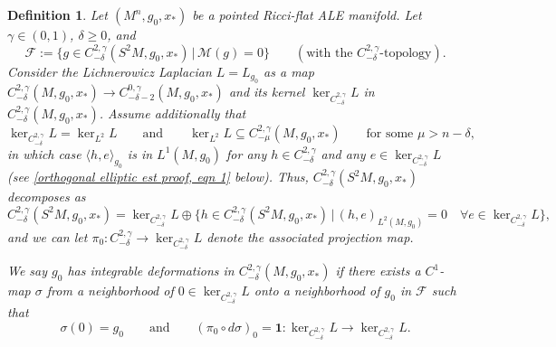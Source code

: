\documentclass[12pt]{amsart}
\renewcommand{\1}{{\mathbf 1}}
\theoremstyle{others}
\newtheorem{defn}[thm]{Definition}
\numberwithin{equation}{section}
\begin{document}
\begin{defn} \label{defn integrable ALE}
    Let $(M^n, g_0, x_*)$ be a pointed Ricci-flat ALE manifold. 
    Let $\gamma \in (0,1)$, $\delta \ge 0$, and
        $$\mathcal F := \{ g \in C^{2, \gamma}_{-\delta}(S^2M, g_0, x_*) \, | \, \mathcal M(g) = 0 \} \qquad (\text{with the } C^{2, \gamma}_{-\delta}  \text{-topology}).$$
    Consider the Lichnerowicz Laplacian $L = L_{g_0}$ as a map $C^{2, \gamma}_{-\delta} (M, g_0, x_*) \to C^{0, \gamma}_{-\delta-2} (M, g_0, x_*)$ and its kernel $\ker_{C^{2, \gamma}_{-\delta}} L $ in $C^{2, \gamma}_{-\delta}(M, g_0, x_*)$.
    Assume additionally that 
    \begin{equation} \label{eqn assumption for integrability defn}
        \ker_{C^{2, \gamma}_{-\delta}} L = \ker_{L^2} L \qquad \text{and} \qquad \ker_{L^2} L  \subseteq C^{2, \gamma}_{-\mu}(M, g_0, x_*) \qquad \text{for some } \mu > n-\delta,
    \end{equation}
    in which case $\langle h, e \rangle_{g_0}$ is in $L^1(M, g_0)$ for any $h \in C^{2, \gamma}_{-\delta}$ and any $e \in \ker_{C^{2, \gamma}_{-\delta}} L $ (see \eqref{orthogonal elliptic est proof, eqn 1} below).
    Thus, $C^{2, \gamma}_{-\delta}(S^2M , g_0, x_*) $ decomposes as
        $$C^{2, \gamma}_{-\delta}(S^2M , g_0, x_*) = \ker_{C^{2, \gamma}_{-\delta}} L \oplus \{ h \in C^{2, \gamma}_{-\delta}(S^2M, g_0, x_*) \, | \, ( h , e )_{L^2(M, g_0)} = 0 \quad \forall e \in \ker_{C^{2, \gamma}_{-\delta}} L \},$$
    and we can let $\pi_0: C^{2, \gamma}_{-\delta} \to \ker_{C^{2, \gamma}_{-\delta}} L$ denote the associated projection map.

    We say $g_0$ has \emph{integrable deformations in $C^{2, \gamma}_{-\delta}(M, g_0, x_*)$} if there exists a $C^1$-map $\sigma$ from a neighborhood of $0 \in \ker_{C^{2, \gamma}_{-\delta}} L$ onto a neighborhood of $g_0$ in $\mathcal F$ such that 
        $$\sigma(0) = g_0 \qquad \text{and} \qquad \left( \pi_0 \circ d \sigma \right)_0 = \mathbf 1 : \ker_{C^{2, \gamma}_{-\delta}} L \to \ker_{C^{2, \gamma}_{-\delta}} L.$$
\end{defn}

\bigskip
\end{document}
